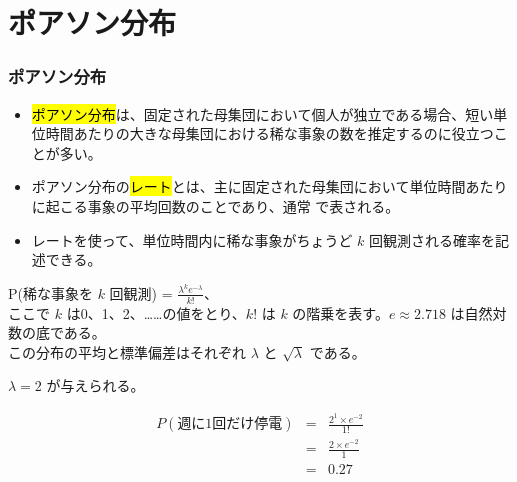 
\section{ポアソン分布}


\begin{frame}
\frametitle{ポアソン分布}

\begin{itemize}

\item \hl{ポアソン分布}は、固定された母集団において個人が独立である場合、短い単位時間あたりの大きな母集団における稀な事象の数を推定するのに役立つことが多い。

\item ポアソン分布の\hl{レート}とは、主に固定された母集団において単位時間あたりに起こる事象の平均回数のことであり、通常 \mathhl{\lambda} で表される。

\item レートを使って、単位時間内に稀な事象がちょうど $k$ 回観測される確率を記述できる。

\end{itemize}

\vfill

{
P(稀な事象を $k$ 回観測) = $\frac{\lambda^k e^{-\lambda}}{k!}$、\\
ここで $k$ は0、1、2、……の値をとり、$k!$ は $k$ の階乗を表す。$e \approx 2.718$ は自然対数の底である。\\

この分布の平均と標準偏差はそれぞれ $\lambda$ と $\sqrt{\lambda}$ である。
}

\end{frame}


\begin{frame}


$\lambda = 2$ が与えられる。

\begin{eqnarray*}
P(\text{週に1回だけ停電}) &=& \frac{2^1 \times e^{-2}}{1!} \\
&=& \frac{2 \times e^{-2}}{1} \\
&=& 0.27
\end{eqnarray*}

\end{frame}

